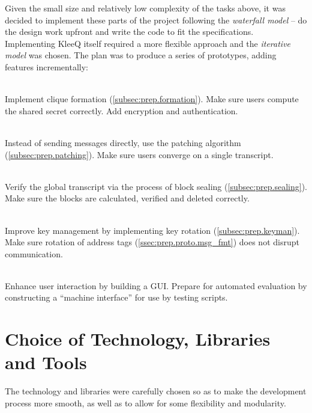 \documentclass[a4paper, 12pt]{report}
\begin{document}
Given the small size and relatively low complexity of the tasks above, it was decided to implement these parts of the project following the \emph{waterfall model} -- do the design work upfront and write the code to fit the specifications. \\

Implementing KleeQ itself required a more flexible approach and the \emph{iterative model} was chosen. The plan was to produce a series of prototypes, adding features incrementally:
\begin{description}[labelindent=0.5cm, leftmargin=1.3cm, rightmargin=0.5cm]
    \item[Prototype 1: Clique Formation]\hfill \\
        Implement clique formation (\cref{subsec:prep.formation}). Make sure users compute the shared secret correctly. Add encryption and authentication.
    \item[Prototype 2: Patching]\hfill \\
        Instead of sending messages directly, use the patching algorithm (\cref{subsec:prep.patching}). Make sure users converge on a single transcript.
    \item[Prototype 3: Sealing]\hfill \\
        Verify the global transcript via the process of block sealing (\cref{subsec:prep.sealing}). Make sure the blocks are calculated, verified and deleted correctly.
    \item[Prototype 4: Key Management]\hfill \\
        Improve key management by implementing key rotation (\cref{subsec:prep.keyman}). Make sure rotation of address tags (\cref{ssec:prep.proto.msg_fmt}) does not disrupt communication.
    \item[Prototype 5: Interface] \hfill \\
        Enhance user interaction by building a GUI. Prepare for automated evaluation by constructing a ``machine interface'' for use by testing scripts. 
\end{description}

\section{Choice of Technology, Libraries and Tools}
\label{sec:choices}
The technology and libraries were carefully chosen so as to make the development process more smooth, as well as to allow for some flexibility and modularity.
\end{document}
